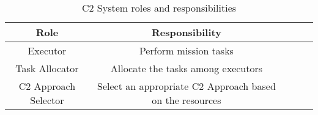 \begin{table}[ht]
	\small
	\fontsize{10}{10}\selectfont
	\centering
	\caption{C2 System roles and responsibilities}
	\label{table:table04}
	
	\begin{tabular}{ccccc}
	\hline
		\textbf{Role}
		& \textbf{Responsibility} \\ [1ex]
	\hline	
	
	Executor & Perform mission tasks  \\[1ex]
	Task Allocator & Allocate the tasks among executors \\[1ex]
	C2 Approach Selector & Select an appropriate C2 Approach based on the resources \\[1ex]
	\hline
	\end{tabular}
\end{table} 